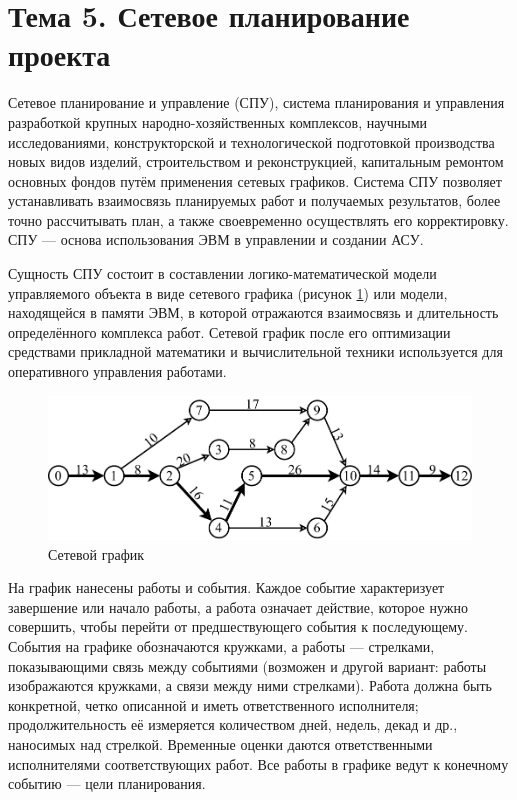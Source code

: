 \section{Тема 5. Сетевое планирование проекта}

Сетевое планирование и управление (СПУ), система планирования и управления разработкой крупных народно-хозяйственных комплексов, научными исследованиями, конструкторской и технологической подготовкой производства новых видов изделий, строительством и реконструкцией, капитальным ремонтом основных фондов путём применения сетевых графиков. Система СПУ позволяет устанавливать взаимосвязь планируемых работ и получаемых результатов, более точно рассчитывать план, а также своевременно осуществлять его корректировку. СПУ --- основа использования ЭВМ в управлении и создании АСУ.

Сущность СПУ состоит в составлении логико-математической модели управляемого объекта в виде сетевого графика (рисунок \ref{fig:seti}) или модели, находящейся в памяти ЭВМ, в которой отражаются взаимосвязь и длительность определённого комплекса работ. Сетевой график после его оптимизации средствами прикладной математики и вычислительной техники используется для оперативного управления работами.
\begin{figure}[!h]
	\centering
	\includegraphics[width=0.7\linewidth]{seti}
	\caption{Сетевой график}
	\label{fig:seti}
\end{figure}

На график нанесены работы и события. Каждое событие характеризует завершение или начало работы, а работа означает действие, которое нужно совершить, чтобы перейти от предшествующего события к последующему. События на графике обозначаются кружками, а работы --- стрелками, показывающими связь между событиями (возможен и другой вариант: работы изображаются кружками, а связи между ними стрелками). Работа должна быть конкретной, четко описанной и иметь ответственного исполнителя; продолжительность её измеряется количеством дней, недель, декад и др., наносимых над стрелкой. Временные оценки даются ответственными исполнителями соответствующих работ. Все работы в графике ведут к конечному событию --- цели планирования.

